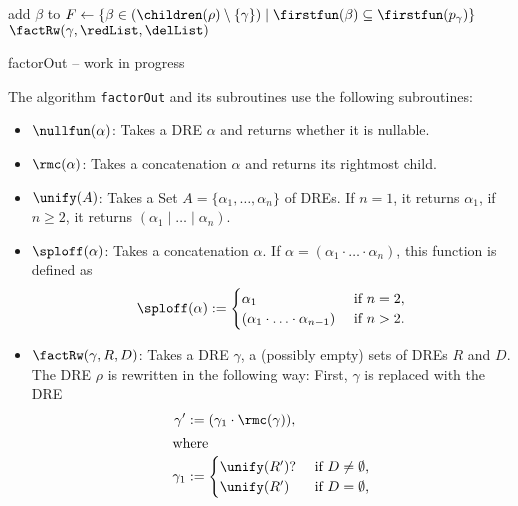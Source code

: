 \documentclass[a4paper,11pt, svgnames,titlepage]{article}
\newcommand{\rxo}{\mathtt{?}}
\newcommand{\rxc}{\cdot}
\DeclareMathOperator{\ror}{\mathtt{|}}
\DeclareMathOperator{\eqModEw}{=_{\emptyword}}
\newcommand{\emptyword}{\varepsilon}
\newcommand{\df}{:=}
\begin{document}
\begin{algorithm2e}[H]
{{		}
	}
	\Else
	{
		{
			{
				add $\beta$ to \redList\;
			}
		}
		$F\leftarrow \{\beta\in(\children(\rho)\setminus\{\gamma\})\mid \firstfun(\beta)\subseteq \firstfun(p_\gamma)\}$\;
		{
			\lIf{$L(\unify(F))\eqModEw L(p_\gamma)$}{$\delList\leftarrow F$}
		}
		\Else
		{
		}
		\If{$(\redList\cup\delList)\neq \emptyset$}
		{
			$\factRw(\gamma,\redList,\delList)$\;
		}
	}
	
	\caption{factorOut -- work in progress\label{algo:factor}}
\end{algorithm2e}
The algorithm \texttt{factorOut} and its subroutines use the following subroutines:
\begin{itemize}
	\item $\nullfun(\alpha)$: Takes a DRE $\alpha$ and returns whether it is nullable.
	\item $\rmc(\alpha)$: Takes a concatenation $\alpha$ and returns its rightmost child.
	\item $\unify(A)$: Takes a Set $A=\{\alpha_1,\ldots,\alpha_n\}$ of DREs. If $n=1$, it returns $\alpha_1$, if $n\geq 2$, it returns $(\alpha_1\ror\ldots\ror\alpha_n)$.
	\item $\sploff(\alpha)$: Takes a concatenation $\alpha$. If $\alpha=(\alpha_1\rxc\ldots\rxc \alpha_n)$, this function is defined as
	\[\sploff(\alpha)\df \begin{cases}
		\alpha_1 & \text{ if $n=2$},\\
		(\alpha_1\rxc\ldots\rxc \alpha_{n-1})& \text{ if $n>2$.}
	\end{cases}\]
	\item $\factRw(\gamma,R,D)$: Takes a DRE $\gamma$, a (possibly empty) sets of DREs $R$ and $D$. The DRE $\rho$ is  rewritten in the following way: First, $\gamma$ is replaced with the DRE 
\begin{align*}
	\gamma'&\df (\gamma_1\rxc \rmc(\gamma)),\\
	\shortintertext{where}
	\gamma_1&\df \begin{cases}
		\unify(R')\rxo & \text{ if $D\neq \emptyset$,}\\
		\unify(R') & \text{ if $D=\emptyset$,}
	\end{cases}

\end{align*}
\end{itemize}
\end{document}
